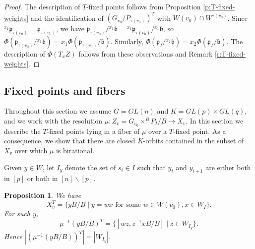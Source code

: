 \documentclass[11pt,letterpaper,reqno]{amsart}
\newcommand{\fb}{{\mathfrak b}}
\newcommand{\fp}{{\mathfrak p}}
\numberwithin{equation}{section}
\theoremstyle{plain}
\newtheorem{proposition}[theorem]{Proposition}
\theoremstyle{definition}
\theoremstyle{remark}
\begin{document}
\begin{proof}
The description of $T$-fixed points follows from Proposition \ref{p:T-fixed-weights} and 
the identification of $(G_{v_0}/P_{\tau(v_0)})^T $ with $W(v_0) \cap W^{\tau(v_0)}$.
Since ${}^{x_1} \fp_{\tau(v_0)} = \fp_{\tau(v_0)}$, we have $\fp_{\tau(v_0)}/ {}^{x_1}\fb = {}^{x_1} \fp_{\tau(v_0)}/ {}^{x_1}\fb$,
so $\Phi(\fp_{\tau(v_0)}/ {}^{x_1}\fb) = x_1\Phi(\fp_{\tau(v_0)}/\fb)$.  Similarly, $\Phi(\fp_I/  {}^{x_2}\fb) = x_2 \Phi(\fp_I/\fb)$.
The description of $\Phi(T_x Z)$ follows from these observations and Remark \ref{r:T-fixed-weights}.
\end{proof}


\subsection{Fixed points and fibers} \label{ss:fixedpoint-gl}
Throughout this section we assume $G = GL(n)$ and $K = GL(p) \times GL(q)$, and
we work with the resolution $\mu: Z_v = G_{v_0} \times^B P_I/B \to X_v$.
In this section we describe the $T$-fixed points lying in a fiber of $\mu$
over a $T$-fixed point.  As a consequence, we show that there are
closed $K$-orbits contained in the subset of $X_v$ over which $\mu$ is birational.

Given $y \in W$, let $I_y$ denote the set of $ s_i \in I$ such that $y_i$ and $y_{i+1}$ are 
either both in $[p]$ or both in $[n] \smallsetminus [p]$.

\begin{proposition} \label{p:fixedpoint-inverse}
We have
\begin{equation} \label{e:fixedpoint-inverse1}
X_v^T = \{ y B/B \mid y = wx \mbox{ for some } w \in W(v_0), x \in W_I \}.
\end{equation}
For such $y$,
\begin{equation} \label{e:fixedpoint-inverse2}
\mu^{-1}(yB/B)^T = \{ [w z, z^{-1} x B/B ]  \mid z \in W_{I_y} \}.
\end{equation}
Hence $| (\mu^{-1}(yB/B))^T | = | W_{I_y} |$.
\end{proposition}
\end{document}
